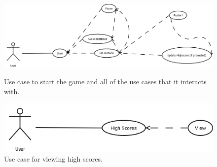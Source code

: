 \documentclass[10pt,conference,onecolumn,compsoc]{IEEEtran}
\begin{document}
\begin{figure}[h!]
\centering
\includegraphics[scale=.4]{Start.png}
\caption{Use case to start the game and all of the use cases that it interacts with.}
\label{Start}

\includegraphics[scale=.5]{HighScores.png}
\caption{Use case for viewing high scores.}
\label{Scores}
\end{figure}
\end{document}
